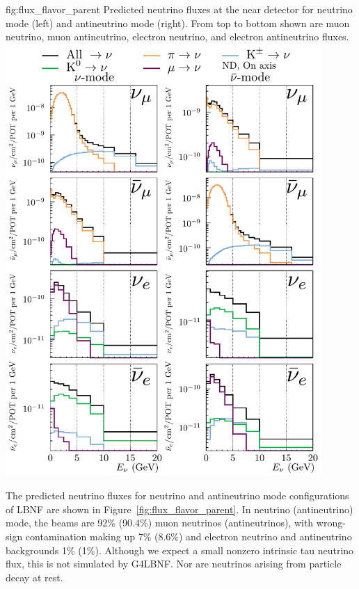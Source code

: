 \begin{dunefigure}{fig:flux_flavor_parent}
{Predicted neutrino fluxes at the near detector for neutrino mode (left) and antineutrino mode (right). From top to bottom shown are muon neutrino, muon antineutrino, electron neutrino, and electron antineutrino fluxes.}
\includegraphics[width=0.9\textwidth]{graphics/ND_HadronParentFluxComponents_0m_offaxis.pdf}

\end{dunefigure}


The predicted neutrino fluxes for neutrino and antineutrino mode configurations of LBNF are shown in Figure~\ref{fig:flux_flavor_parent}.  In neutrino (antineutrino) mode, the beams are 92\% (90.4\%) muon neutrinos (antineutrinos), with wrong-sign contamination making up 7\% (8.6\%) and electron neutrino and antineutrino backgrounds 1\% (1\%).  Although %
we expect a small nonzero intrinsic tau neutrino flux, this is not simulated by G4LBNF.  Nor are neutrinos arising from particle decay at rest. %


